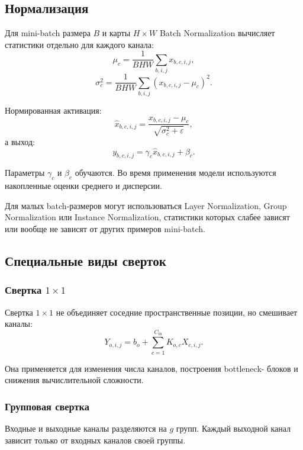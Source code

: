 \documentclass[12pt,a4paper]{article}
\numberwithin{equation}{section}
\theoremstyle{definition}
\theoremstyle{remark}
\begin{document}
\subsection{Нормализация}

Для mini-batch размера \(B\) и карты \(H\times W\) Batch Normalization
вычисляет статистики отдельно для каждого канала:
\[
    \mu_c
    =
    \frac{1}{BHW}
    \sum_{b,i,j}x_{b,c,i,j},
\]
\[
    \sigma_c^2
    =
    \frac{1}{BHW}
    \sum_{b,i,j}(x_{b,c,i,j}-\mu_c)^2.
\]

Нормированная активация:
\[
    \widehat{x}_{b,c,i,j}
    =
    \frac{x_{b,c,i,j}-\mu_c}
    {\sqrt{\sigma_c^2+\varepsilon}},
\]
а выход:
\[
    y_{b,c,i,j}
    =
    \gamma_c\widehat{x}_{b,c,i,j}+\beta_c.
\]

Параметры \(\gamma_c\) и \(\beta_c\) обучаются. Во время применения
модели используются накопленные оценки среднего и дисперсии.

Для малых batch-размеров могут использоваться Layer Normalization,
Group Normalization или Instance Normalization, статистики которых
слабее зависят или вообще не зависят от других примеров mini-batch.

\subsection{Специальные виды сверток}

\subsubsection{Свертка \(1\times1\)}

Свертка \(1\times1\) не объединяет соседние пространственные позиции,
но смешивает каналы:
\[
    Y_{o,i,j}
    =
    b_o+
    \sum_{c=1}^{C_{\mathrm{in}}}
    K_{o,c}X_{c,i,j}.
\]

Она применяется для изменения числа каналов, построения bottleneck-
блоков и снижения вычислительной сложности.

\subsubsection{Групповая свертка}

Входные и выходные каналы разделяются на \(g\) групп. Каждый выходной
канал зависит только от входных каналов своей группы.
\end{document}
